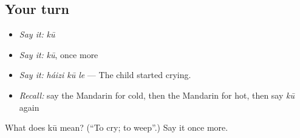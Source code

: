 \subsection*{Your turn}
\begin{itemize}
\raggedright
  \item \emph{Say it:} \emph{kū}
  \item \emph{Say it:} \emph{kū}, once more
  \item \emph{Say it:} \emph{háizi kū le} — The child started crying.
  \item \emph{Recall:} say the Mandarin for cold, then the Mandarin for hot, then say \emph{kū} again
\end{itemize}

\begin{tcolorbox}[breakable,colback=teal!4,colframe=teal!35!black,title={Before you move on}]
What does kū mean? (\textquotedblleft{}To cry; to weep\textquotedblright{}.) Say it once more.
\end{tcolorbox}
